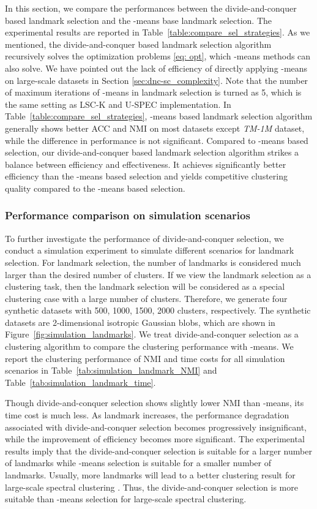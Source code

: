 In this section, we compare the performances between the divide-and-conquer based landmark selection and the -means base landmark selection.
The experimental results are reported in Table~\ref{table:compare_sel_strategies}.
As we mentioned, the divide-and-conquer based landmark selection algorithm recursively solves the optimization problems \ref{eq: opt}, which -means methods can also solve.
We have pointed out the lack of efficiency of directly applying -means on large-scale datasets in Section \ref{sec:dnc-sc_complexity}.
Note that the number of maximum iterations of -means in landmark selection is turned as 5, which is the same setting as LSC-K and U-SPEC implementation.
In Table~\ref{table:compare_sel_strategies}, -means based landmark selection algorithm generally shows better ACC and NMI on most datasets except \emph{TM-1M} dataset, while the difference in performance is not significant.
Compared to -means based selection, our divide-and-conquer based landmark selection algorithm strikes a balance between efficiency and effectiveness.
It achieves significantly better efficiency than the -means based selection and yields competitive clustering quality compared to the -means based selection.

\subsubsection{Performance comparison on simulation scenarios}
To further investigate the performance of divide-and-conquer selection, we conduct a simulation experiment to simulate different scenarios for landmark selection.
For landmark selection, the number of landmarks is considered much larger than the desired number of clusters. 
If we view the landmark selection as a clustering task, then the landmark selection will be considered as a special clustering case with a large number of clusters.
Therefore, we generate four synthetic datasets with 500, 1000, 1500, 2000 clusters, respectively. 
The synthetic datasets are 2-dimensional isotropic Gaussian blobs, which are shown in Figure~\ref{fig:simulation_landmarks}.
We treat divide-and-conquer selection as a clustering algorithm to compare the clustering performance with -means.
We report the clustering performance of NMI and time costs for all simulation scenarios in Table~\ref{tab:simulation_landmark_NMI} and Table~\ref{tab:simulation_landmark_time}. 

Though divide-and-conquer selection shows slightly lower NMI than -means, its time cost is much less.
As landmark increases, the performance degradation associated with divide-and-conquer selection becomes progressively insignificant, while the improvement of efficiency becomes more significant.
The experimental results imply that the divide-and-conquer selection is suitable for a larger number of landmarks while -means selection is suitable for a smaller number of landmarks.
Usually, more landmarks will lead to a better clustering result for large-scale spectral clustering \cite{cai2014large,huang2019ultra}.
Thus, the divide-and-conquer selection is more suitable than -means selection for large-scale spectral clustering.

